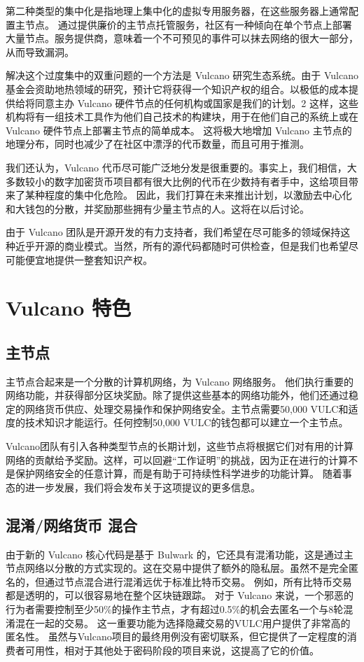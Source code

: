 \documentclass[A4paper, 12pt]{article}
\begin{document}
第二种类型的集中化是指地理上集中化的虚拟专用服务器，在这些服务器上通常配置主节点。   通过提供廉价的主节点托管服务，社区有一种倾向在单个节点上部署大量节点。服务提供商，意味着一个不可预见的事件可以抹去网络的很大一部分，从而导致漏洞。 

解决这个过度集中的双重问题的一个方法是 Vulcano 研究生态系统。由于 Vulcano 基金会资助地热领域的研究，预计它将获得一个知识产权的组合。以极低的成本提供给将同意主办 Vulcano 硬件节点的任何机构或国家是我们的计划。2 这样，这些机构将有一组技术工具作为他们自己技术的构建块，用于在他们自己的系统上或在 Vulcano 硬件节点上部署主节点的简单成本。    这将极大地增加 Vulcano 主节点的地理分布，同时也减少了在社区中漂浮的代币数量，而且可用于推测。

我们还认为，Vulcano 代币尽可能广泛地分发是很重要的。事实上，我们相信，大多数较小的数字加密货币项目都有很大比例的代币在少数持有者手中，这给项目带来了某种程度的集中化危险。  因此，我们打算在未来推出计划，以激励去中心化和大钱包的分散，并奖励那些拥有少量主节点的人。这将在以后讨论。

由于 Vulcano 团队是开源开发的有力支持者，我们希望在尽可能多的领域保持这种近乎开源的商业模式。当然，所有的源代码都随时可供检查，但是我们也希望尽可能便宜地提供一整套知识产权。

\section{Vulcano 特色}
\subsection {主节点}
主节点合起来是一个分散的计算机网络，为 Vulcano 网络服务。  他们执行重要的网络功能，并获得部分区块奖励。除了提供这些基本的网络功能外，他们还通过稳定的网络货币供应、处理交易操作和保护网络安全。主节点需要50,000 VULC和适度的技术知识才能运行。任何控制50,000 VULC的钱包都可以建立一个主节点。

Vulcano团队有引入各种类型节点的长期计划，这些节点将根据它们对有用的计算网络的贡献给予奖励。这样，可以回避“工作证明”的挑战，因为正在进行的计算不是保护网络安全的任意计算，而是有助于可持续性科学进步的功能计算。  随着事态的进一步发展，我们将会发布关于这项提议的更多信息。

\subsection{混淆/网络货币 混合}
由于新的 Vulcano 核心代码是基于 Bulwark 的，它还具有混淆功能，这是通过主节点网络以分散的方式实现的。这在交易中提供了额外的隐私层。虽然不是完全匿名的，但通过节点混合进行混淆远优于标准比特币交易。   例如，所有比特币交易都是透明的，可以很容易地在整个区块链跟踪。  对于 Vulcano 来说，一个邪恶的行为者需要控制至少50\%的操作主节点，才有超过0.5\%的机会去匿名一个与8轮混淆混在一起的交易。  这一重要功能为选择隐藏交易的VULC用户提供了非常高的匿名性。   虽然与Vulcano项目的最终用例没有密切联系，但它提供了一定程度的消费者可用性，相对于其他处于密码阶段的项目来说，这提高了它的价值。
\end{document}
